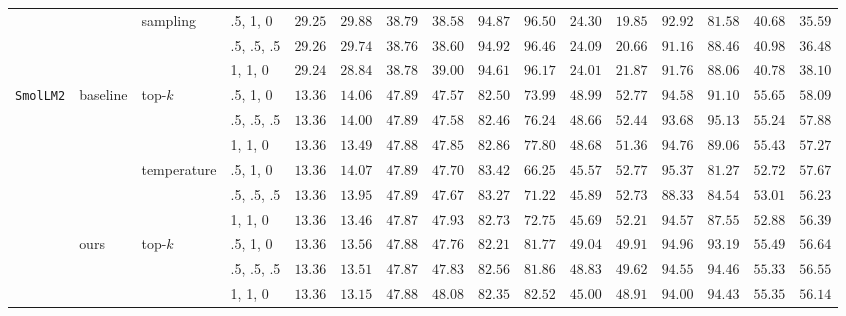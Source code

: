 \begin{table*}[t]
\begin{tabular}{llllcccccccccccc}
        \cmidrule{3-16}
        & & \multirow{3}{*}{sampling}  
            & .5, 1, 0 & $29.25$ & $29.88$ & $38.79$ & $38.58$ & $94.87$ & $96.50$ & $24.30$ & $19.85$ & $92.92$ & $81.58$ & $40.68$ & $35.59$ \\
        & & & .5, .5, .5 & $29.26$ & $29.74$ & $38.76$ & $38.60$ & $94.92$ & $96.46$ & $24.09$ & $20.66$ & $91.16$ & $88.46$ & $40.98$ & $36.48$ \\
        & & & 1, 1, 0 & $29.24$ & $28.84$ & $38.78$ & $39.00$ & $94.61$ & $96.17$ & $24.01$ & $21.87$ & $91.76$ & $88.06$ & $40.78$ & $38.10$ \\
        \midrule
        \multirow{12}{*}{\texttt{SmolLM2}} 
        & \multirow{6}{*}{baseline}
        & \multirow{3}{*}{top-$k$} 
            & .5, 1, 0 & $13.36$ & $14.06$ & $47.89$ & $47.57$ & $82.50$ & $73.99$ & $48.99$ & $52.77$ & $94.58$ & $91.10$ & $55.65$ & $58.09$ \\
        & & & .5, .5, .5 & $13.36$ & $14.00$ & $47.89$ & $47.58$ & $82.46$ & $76.24$ & $48.66$ & $52.44$ & $93.68$ & $95.13$ & $55.24$ & $57.88$ \\
        & & & 1, 1, 0 & $13.36$ & $13.49$ & $47.88$ & $47.85$ & $82.86$ & $77.80$ & $48.68$ & $51.36$ & $94.76$ & $89.06$ & $55.43$ & $57.27$ \\
        \cmidrule{3-16}
        & & \multirow{3}{*}{temperature}  
            & .5, 1, 0 & $13.36$ & $14.07$ & $47.89$ & $47.70$ & $83.42$ & $66.25$ & $45.57$ & $52.77$ & $95.37$ & $81.27$ & $52.72$ & $57.67$ \\
        & & & .5, .5, .5 & $13.36$ & $13.95$ & $47.89$ & $47.67$ & $83.27$ & $71.22$ & $45.89$ & $52.73$ & $88.33$ & $84.54$ & $53.01$ & $56.23$ \\
        & & & 1, 1, 0 & $13.36$ & $13.46$ & $47.87$ & $47.93$ & $82.73$ & $72.75$ & $45.69$ & $52.21$ & $94.57$ & $87.55$ & $52.88$ & $56.39$ \\
        \cmidrule{2-16}
        & \multirow{6}{*}{ours}
        & \multirow{3}{*}{top-$k$} 
            & .5, 1, 0 & $13.36$ & $13.56$ & $47.88$ & $47.76$ & $82.21$ & $81.77$ & $49.04$ & $49.91$ & $94.96$ & $93.19$ & $55.49$ & $56.64$ \\
        & & & .5, .5, .5 & $13.36$ & $13.51$ & $47.87$ & $47.83$ & $82.56$ & $81.86$ & $48.83$ & $49.62$ & $94.55$ & $94.46$ & $55.33$ & $56.55$ \\
        & & & 1, 1, 0 & $13.36$ & $13.15$ & $47.88$ & $48.08$ & $82.35$ & $82.52$ & $45.00$ & $48.91$ & $94.00$ & $94.43$ & $55.35$ & $56.14$ \\
        \cmidrule{3-16}

\end{tabular}
\end{table*}
